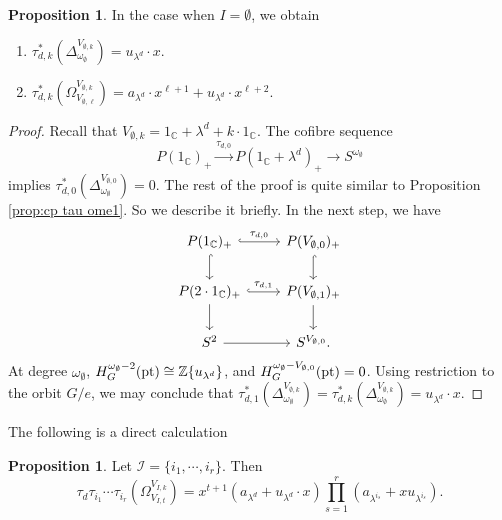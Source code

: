 \documentclass[a4paper,leqno,11pt]{amsart}
\theoremstyle{plain}
\theoremstyle{definition}
\newtheorem{prop}[theorem]{Proposition}
\theoremstyle{remark}
\theoremstyle{definition}
\newcommand{\C}{{\mathbb C}}
\newcommand{\Z}{{\mathbb{Z}}}
\def\Z{\mathbb{Z}}
\def\C{\mathbb{C}}
\numberwithin{equation}{section}
\newcommand{\pt}{\textup{pt}}
\begin{document}
	\begin{prop}\label{prop:empty case}
		In the case when $ I =\emptyset $, we obtain
		\begin{enumerate}
			\item 	$ \tau_{d,k}^*(\Delta^{V_{\emptyset,k}}_{\omega _\emptyset})=u_{\lambda^d}\cdot x. $
			\item $ 	\tau_{d,k}^*(\Omega^{V_{\emptyset,k}}_{V _{\emptyset,\ell}})=a_{\lambda^d} \cdot x^{\ell+1}+u_{\lambda^d}\cdot x^{\ell+2}. $
		\end{enumerate}
	\end{prop}
	\begin{proof}
		Recall that $ V_{\emptyset,k}=1_\C+\lambda^d+k\cdot1_\C $. The cofibre sequence 
		\[
		P(1_\C)_+\xrightarrow{\tau _{d,0}}P(1_\C+\lambda^d)_+\to S^{\omega _\emptyset}
		\]
		implies $ \tau _{d,0} ^*(\Delta_{\omega _\emptyset}^{V_{\emptyset,0}})=0$. The rest of the proof is quite similar to  Proposition  \ref{prop:cp tau ome1}. So we describe it briefly. In the next step, we have
		\begin{equation*}\label{}
			\begin{tikzcd}
				P(1_\C)_+ \ar[r, hook, "\tau_{d,0}"] \arrow[d,hook,""'] & P(V_{\emptyset,0})_+\ar[d,hook, ""] \\
				P(2\cdot1_\C)_+ \ar[r, hook, "\tau_{d,1}"] \ar[d] & P(V_{\emptyset,1})_+\arrow[d, ""] \\
				S^2 \ar[r, ""']                       & S^{V_{\emptyset,0}}.          
			\end{tikzcd}  
		\end{equation*}	
		At degree $ \omega _\emptyset $, $ H_G^{\omega _\emptyset-2}(\pt)\cong \Z\{u_{\lambda^d}\} $, and $ H_G^{\omega _\emptyset-V_{\emptyset,0}}(\pt)=0$. Using restriction to the orbit $ G/e $, we may conclude that   $\tau_{d,1}^*(\Delta^{V_{\emptyset,k}}_{\omega _\emptyset})=\tau_{d,k}^*(\Delta^{V_{\emptyset,k}}_{\omega _\emptyset})=u_{\lambda^d}\cdot x  $.
	\end{proof}
	The following is a direct calculation
	\begin{prop}\label{prop:calcu}
		Let $ \mathcal{I}=\{i_1,\cdots, i_r\} $. Then	
		$$
		\tau_d \tau _{i_1}\cdots\tau _{i_r}(\Omega^{V_{I,k}}_{V_{I,t}})=x^{t+1}(a_{\lambda^d}+u_{\lambda^d}\cdot x)\prod_{s=1}^r(a_{\lambda^{i_s}}+xu_{\lambda^{i_s}}).
		$$
	\end{prop}
\end{document}
